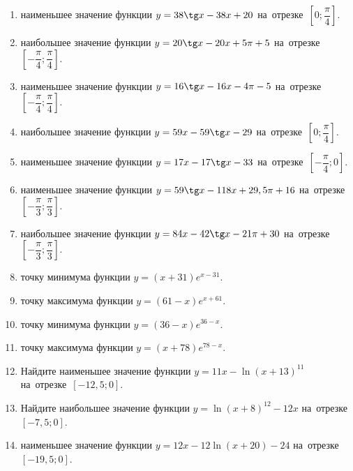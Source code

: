 \documentclass[a4paper,10pt]{article}
\begin{document}
\begin{enumerate}
\item {} наименьшее значение функции $y = 38\tg x-38x+20$ на~отрезке~$\left[0;\dfrac{\pi }{4}\right]$.

\item {} наибольшее значение функции $y=20\tg x-20x+5\pi +5$ на~отрезке~$\left[-\dfrac{\pi }{4};\dfrac{\pi }{4}\right]$.

\item {} наименьшее значение функции $y=16\tg x-16x-4\pi -5$ на~отрезке~$\left[-\dfrac{\pi }{4};\dfrac{\pi }{4}\right]$.

\item {} наибольшее значение функции $y = 59x-59\tg x -29$ на~отрезке~$\left[0;\dfrac{\pi }{4}\right]$.

\item {} наименьшее значение функции $y = 17x-17\tg x -33$ на~отрезке~$\left[-\dfrac{\pi }{4};0\right]$.

\item {} наименьшее значение функции $y = 59\tg x-118x+29,5 \pi +16$ на~отрезке~$\left[-\dfrac{\pi }{3};\dfrac{\pi }{3}\right]$.

\item {} наибольшее значение функции $y = 84x-42\tg x-21\pi +30$ на~отрезке~$\left[-\dfrac{\pi }{3};\dfrac{\pi }{3}\right]$.

\item {} точку минимума функции $y = \left(x+31\right)e^{x-31}$.

\item {} точку максимума функции $y = \left(61-x\right)e^{x+61}$.

\item {} точку минимума функции $y = \left(36-x\right)e^{36-x}$.

\item {} точку максимума функции $y = \left(x+78\right)e^{78-x}$.

\item Найдите наименьшее значение функции $y = 11x-\ln \left(x+13\right)^{11}$ на~отрезке~$\left[-12,5;0\right]$.

\item Найдите наибольшее значение функции $y = \ln \left(x+8\right)^{12}-12x$ на~отрезке~$\left[-7,5;0\right]$.

\item {} наименьшее значение функции $y = 12x-12\ln \left(x+20\right) -24$ на~отрезке~$\left[-19,5;0\right]$.


\end{enumerate}
\end{document}
